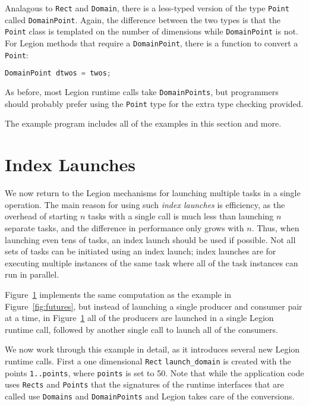 Analagous to {\tt Rect} and {\tt Domain}, there is a less-typed version of the type {\tt Point} called {\tt DomainPoint}.
Again, the difference between the two types is that the {\tt Point} class is templated on the number of dimensions 
while {\tt DomainPoint} is not.  For Legion methods that require a {\tt DomainPoint}, there is a function to convert a
{\tt Point}:
\begin{lstlisting}[language=C++,style=inline]
DomainPoint dtwos = twos;
\end{lstlisting}
As before, most Legion runtime calls take {\tt DomainPoints}, but programmers should probably prefer using the {\tt Point} type
for the extra type checking provided.

The example program  includes all of the examples in this section and more.

\section{Index Launches}
\label{sec:indexlaunch}

We now return to the Legion mechanisms for launching multiple tasks in a
single operation.  The main reason for using such {\em index launches}
is efficiency, as the overhead of starting $n$ tasks with a single
call is much less than launching $n$ separate tasks, and the
difference in performance only grows with $n$.  Thus, when launching
even tens of tasks, an index launch should be used if possible.  Not
all sets of tasks can be initiated using an index launch; 
index launches are for executing multiple instances of the same task
where all of the task instances can run in parallel.

\begin{figure}

\caption{}
\label{fig:indexlaunch}
\end{figure}


Figure~\ref{fig:indexlaunch} implements the same computation as the example in
Figure~\ref{fig:futures}, but instead of launching a single
producer and consumer pair at a time, in Figure~\ref{fig:indexlaunch}
all of the producers are launched in a single Legion runtime call,
followed by another single call to launch all of the consumers.

We now work through this example in detail, as it introduces several
new Legion runtime calls.  First a one dimensional {\tt Rect} 
{\tt launch\_domain} is created with the points {\tt 1..points}, where
{\tt points} is set to 50.  Note that while the application code uses {\tt Rects} and {\tt Points} that the signatures of the runtime interfaces that are called use {\tt Domains} and {\tt DomainPoints} and Legion takes care of the conversions.

